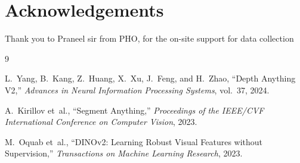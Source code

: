 \documentclass[11pt,a4paper]{article}
\begin{document}
\section*{Acknowledgements}

Thank you to Praneel sir from PHO, for the on-site support for data collection

\begin{thebibliography}{9}

L.~Yang, B.~Kang, Z.~Huang, X.~Xu, J.~Feng, and H.~Zhao,
``Depth Anything V2,''
\textit{Advances in Neural Information Processing Systems}, vol.~37, 2024.

A.~Kirillov et~al.,
``Segment Anything,''
\textit{Proceedings of the IEEE/CVF International Conference on Computer Vision}, 2023.

M.~Oquab et~al.,
``DINOv2: Learning Robust Visual Features without Supervision,''
\textit{Transactions on Machine Learning Research}, 2023.

\end{thebibliography}
\end{document}
